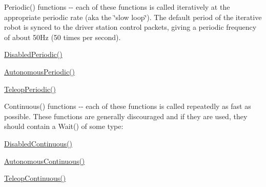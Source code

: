 Periodic() functions -\/-\/ each of these functions is called iteratively at the appropriate periodic rate (aka the \char`\"{}slow loop\char`\"{}). The default period of the iterative robot is synced to the driver station control packets, giving a periodic frequency of about 50Hz (50 times per second).
\begin{DoxyItemize}
\item \hyperlink{classIterativeRobot_a00265f02550b12295ca2cffde2c9c838}{DisabledPeriodic()}
\item \hyperlink{classIterativeRobot_ac579e155cc4613ced00d5e740cf98667}{AutonomousPeriodic()}
\item \hyperlink{classIterativeRobot_a3336d7f71d644e646dba70839f4f4672}{TeleopPeriodic()}
\end{DoxyItemize}

Continuous() functions -\/-\/ each of these functions is called repeatedly as fast as possible. These functions are generally discouraged and if they are used, they should contain a Wait() of some type:
\begin{DoxyItemize}
\item \hyperlink{classIterativeRobot_a86e595ec2e7e645c8ae246243d6a16b8}{DisabledContinuous()}
\item \hyperlink{classIterativeRobot_a766544e4b37b525b2a5d075e90e81b9e}{AutonomousContinuous()}
\item \hyperlink{classIterativeRobot_afdfd6d7b231332af5d6277cb6e91bdfa}{TeleopContinuous()} 
\end{DoxyItemize}

